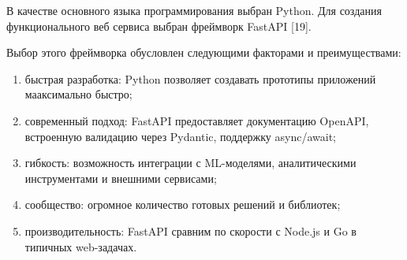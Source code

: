 \documentclass[a4paper,14pt,oneside]{extreport}
\begin{document}

В качестве основного языка программирования выбран Python. Для создания функционального веб сервиса выбран фреймворк FastAPI [19].

Выбор этого фреймворка обусловлен следующими факторами и преимуществами:
\begin{enumerate}[label=\arabic*)]
    \item быстрая разработка: Python позволяет создавать прототипы приложений мааксимально быстро;
    \item современный подход: FastAPI предоставляет документацию OpenAPI, встроенную валидацию через Pydantic, поддержку async/await;
    \item гибкость: возможность интеграции с ML-моделями, аналитическими инструментами и внешними сервисами;
    \item сообщество: огромное количество готовых решений и библиотек;
    \item производительность: FastAPI сравним по скорости с Node.js и Go в типичных web-задачах.
\end{enumerate}
\end{document}
